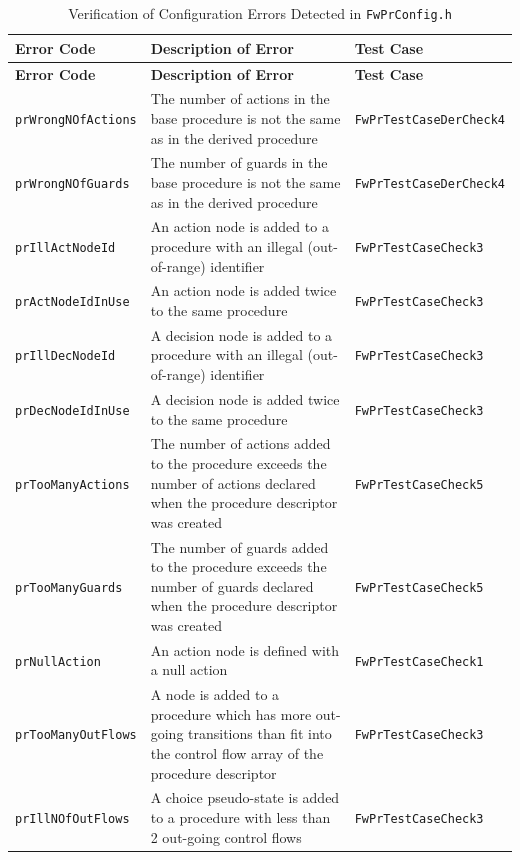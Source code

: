 \documentclass[requirements]{../fwprofile}
\begin{document}
\begin{longtable}{|p{3cm}|p{3.7cm}|p{4.5cm}|}
\caption{Verification of Configuration Errors Detected in \texttt{FwPrConfig.h}}
\label{tab:PR_Config_Error} \\
\hline
\rowcolor{gray}
\textbf{Error Code} & \textbf{Description of Error} & \textbf{Test Case} \\
\hline
\endfirsthead
\rowcolor{gray}
\textbf{Error Code} & \textbf{Description of Error} & \textbf{Test Case} \\
\hline
\endhead
\texttt{prWrongNOfActions} & The number of actions in the base procedure is not the same as in the derived procedure & \texttt{FwPrTestCaseDerCheck4} \\
\hline
\texttt{prWrongNOfGuards} & The number of guards in the base procedure is not the same as in the derived procedure & \texttt{FwPrTestCaseDerCheck4} \\
\hline
\texttt{prIllActNodeId} & An action node is added to a procedure with an illegal (out-of-range) identifier & \texttt{FwPrTestCaseCheck3} \\
\hline
\texttt{prActNodeIdInUse} & An action node is added twice to the same procedure & \texttt{FwPrTestCaseCheck3} \\
\hline
\texttt{prIllDecNodeId} & A decision node is added to a procedure with an illegal (out-of-range) identifier & \texttt{FwPrTestCaseCheck3} \\
\hline
\texttt{prDecNodeIdInUse} & A decision node is added twice to the same procedure & \texttt{FwPrTestCaseCheck3} \\
\hline
\texttt{prTooManyActions} & The number of actions added to the procedure exceeds the number of actions declared when the procedure descriptor was created & \texttt{FwPrTestCaseCheck5} \\
\hline
\texttt{prTooManyGuards} & The number of guards added to the procedure exceeds the number of guards declared when the procedure descriptor was created & \texttt{FwPrTestCaseCheck5} \\
\hline
\texttt{prNullAction} & An action node is defined with a null action & \texttt{FwPrTestCaseCheck1} \\
\hline
\texttt{prTooManyOutFlows} & A node is added to a procedure which has more out-going transitions than fit into the control flow array of the procedure descriptor & \texttt{FwPrTestCaseCheck3} \\
\hline
\texttt{prIllNOfOutFlows} & A choice pseudo-state is added to a procedure with less than 2 out-going control flows & \texttt{FwPrTestCaseCheck3} \\

\end{longtable}
\end{document}
